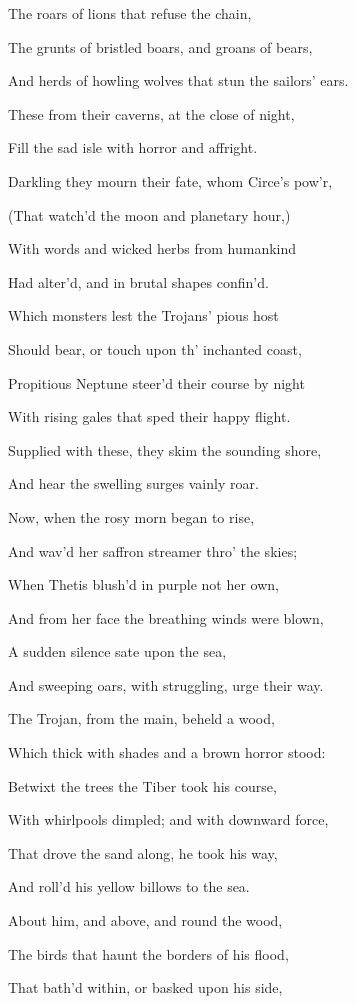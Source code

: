 The roars of lions that refuse the chain,

The grunts of bristled boars, and groans of bears,

And herds of howling wolves that stun the sailors’ ears.

These from their caverns, at the close of night,

Fill the sad isle with horror and affright.

Darkling they mourn their fate, whom Circe’s pow’r,

(That watch’d the moon and planetary hour,)

With words and wicked herbs from humankind

Had alter’d, and in brutal shapes confin’d.

Which monsters lest the Trojans’ pious host

Should bear, or touch upon th’ inchanted coast,

Propitious Neptune steer’d their course by night

With rising gales that sped their happy flight.

Supplied with these, they skim the sounding shore,

And hear the swelling surges vainly roar.

Now, when the rosy morn began to rise,

And wav’d her saffron streamer thro’ the skies;

When Thetis blush’d in purple not her own,

And from her face the breathing winds were blown,

A sudden silence sate upon the sea,

And sweeping oars, with struggling, urge their way.

The Trojan, from the main, beheld a wood,

Which thick with shades and a brown horror stood:

Betwixt the trees the Tiber took his course,

With whirlpools dimpled; and with downward force,

That drove the sand along, he took his way,

And roll’d his yellow billows to the sea.

About him, and above, and round the wood,

The birds that haunt the borders of his flood,

That bath’d within, or basked upon his side,

